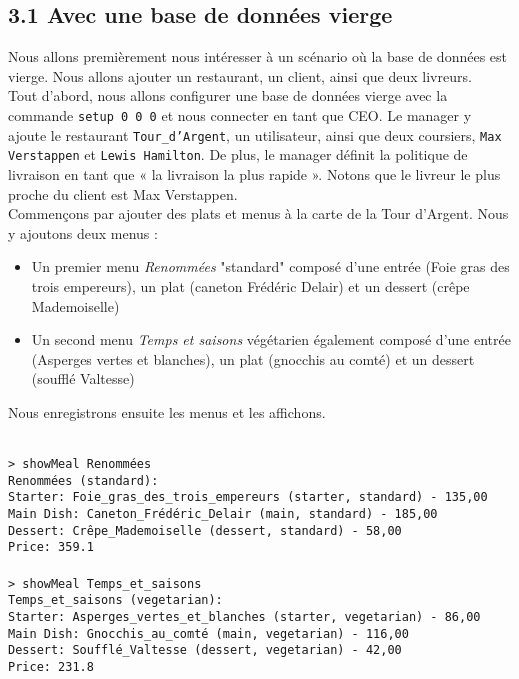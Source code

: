 \subsection*{3.1 Avec une base de données vierge}

Nous allons premièrement nous intéresser à un scénario où la base de données est vierge. Nous allons ajouter un restaurant, un client, ainsi que deux livreurs.\\

Tout d'abord, nous allons configurer une base de données vierge avec la commande \texttt{setup 0 0 0} et nous connecter en tant que CEO. Le manager y ajoute le restaurant \texttt{Tour\_d'Argent}, un utilisateur, ainsi que deux coursiers, \texttt{Max Verstappen} et \texttt{Lewis Hamilton}. De plus, le manager définit la politique de livraison en tant que « la livraison la plus rapide ». Notons que le livreur le plus proche du client est Max Verstappen.\\

Commençons par ajouter des plats et menus à la carte de la Tour d'Argent. Nous y ajoutons deux menus :
\begin{itemize}
    \item Un premier menu \textit{Renommées} "standard" composé d'une entrée (Foie gras des trois empereurs), un plat (caneton Frédéric Delair) et un dessert (crêpe Mademoiselle)
    \item Un second menu \textit{Temps et saisons} végétarien également composé d'une entrée (Asperges vertes et blanches), un plat (gnocchis au comté) et un dessert (soufflé Valtesse)
\end{itemize}
Nous enregistrons ensuite les menus et les affichons.

\texttt{\\
> showMeal Renommées\\
Renommées (standard):\\
Starter: Foie\_gras\_des\_trois\_empereurs (starter, standard) - 135,00\\
Main Dish: Caneton\_Frédéric\_Delair (main, standard) - 185,00\\
Dessert: Crêpe\_Mademoiselle (dessert, standard) - 58,00\\
Price: 359.1\\
\\
> showMeal Temps\_et\_saisons\\
Temps\_et\_saisons (vegetarian):\\
Starter: Asperges\_vertes\_et\_blanches (starter, vegetarian) - 86,00\\
Main Dish: Gnocchis\_au\_comté (main, vegetarian) - 116,00\\
Dessert: Soufflé\_Valtesse (dessert, vegetarian) - 42,00\\
Price: 231.8}\\


